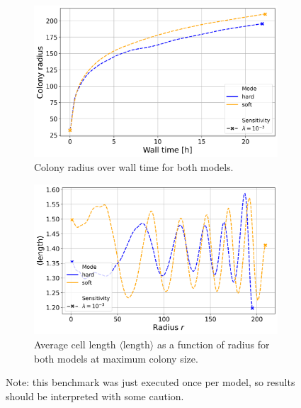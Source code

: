 \documentclass[conference]{IEEEtran}
\begin{document}
\begin{figure}[h]
    \centering
    \begin{subfigure}[b]{0.9\linewidth}
        \centering
        \includegraphics[width=\linewidth]{figures/comparison_plots/huge_wall_time_vs_radius.png}
        \caption{Colony radius over wall time for both models.}
        \label{fig:huge_wall_time_vs_radius}
    \end{subfigure}

    \begin{subfigure}[b]{0.9\linewidth}
        \centering
        \includegraphics[width=\linewidth]{figures/comparison_plots/huge_length_shared.png}
        \caption{Average cell length $\langle \text{length} \rangle$ as a function of radius for both models at maximum colony size.}
        \label{fig:huge_length_shared}
    \end{subfigure}

    \caption{Note: this benchmark was just executed once per model, so results should be interpreted with some caution.}
\end{figure}
\end{document}
